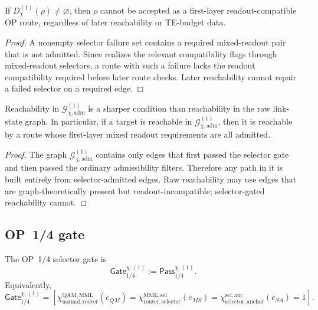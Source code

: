 \begin{lemma}
\label{lem:v410r22-gate-failure-precedes-route-failure}
If \(D_{\chi}^{(1)}(\rho)\neq\varnothing\), then \(\rho\) cannot be accepted as
a first-layer readout-compatible OP route, regardless of later reachability or
TE-budget data.
\end{lemma}

\begin{proof}
A nonempty selector failure set contains a required mixed-readout pair that is
not admitted. Since realizes the relevant compatibility flags through
mixed-readout selectors, a route with such a failure lacks the readout
compatibility required before later route checks. Later reachability cannot
repair a failed selector on a required edge.
\end{proof}

\begin{proposition}
\label{prop:v410r22-selector-gated-reachability-sharper}
Reachability in \(\mathcal G_{\chi,\mathrm{adm}}^{(1)}\) is a sharper condition
than reachability in the raw link-state graph. In particular, if a target is
reachable in \(\mathcal G_{\chi,\mathrm{adm}}^{(1)}\), then it is reachable by a
route whose first-layer mixed readout requirements are all admitted.
\end{proposition}

\begin{proof}
The graph \(\mathcal G_{\chi,\mathrm{adm}}^{(1)}\) contains only edges that
first passed the selector gate and then passed the ordinary admissibility
filters. Therefore any path in it is built entirely from selector-admitted
edges. Raw reachability may use edges that are graph-theoretically present but
readout-incompatible; selector-gated reachability cannot.
\end{proof}

\subsection{OP~1/4 gate}
\label{subsec:v410r22-op14-gate}

\begin{definition}
\label{def:v410r22-op14-selector-gate}
The OP~1/4 selector gate is
\[
 \mathsf{Gate}_{1/4}^{\chi,(1)}
 :=
 \mathsf{Pass}_{1/4}^{\chi,(1)}.
\]
Equivalently,
\[
 \mathsf{Gate}_{1/4}^{\chi,(1)}
 =
 [\chi^{\mathrm{QAM},\mathrm{MML}}_{\mathrm{normal},\mathrm{router}}(e_{QM})=
 \chi^{\mathrm{MML},\mathrm{sel}}_{\mathrm{router},\mathrm{selector}}(e_{MS})=
 \chi^{\mathrm{sel},\mathrm{anc}}_{\mathrm{selector},\mathrm{anchor}}(e_{SA})=1].
\]
\end{definition}

